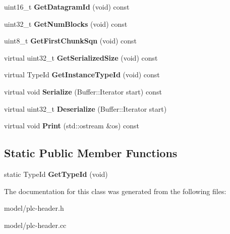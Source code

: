 \begin{DoxyCompactItemize}
\item 
\hypertarget{classns3_1_1PLC__RatelessPhyHeader_aae8ba518f5872336e48f451d7101afe5}{uint16\-\_\-t {\bfseries \-Get\-Datagram\-Id} (void) const }\label{classns3_1_1PLC__RatelessPhyHeader_aae8ba518f5872336e48f451d7101afe5}

\item 
\hypertarget{classns3_1_1PLC__RatelessPhyHeader_a4dd0aad08f2a7f408ae26c5296cb36e0}{uint32\-\_\-t {\bfseries \-Get\-Num\-Blocks} (void) const }\label{classns3_1_1PLC__RatelessPhyHeader_a4dd0aad08f2a7f408ae26c5296cb36e0}

\item 
\hypertarget{classns3_1_1PLC__RatelessPhyHeader_a5c2a261a5f1eb2fb9a241a66bbfcd61b}{uint8\-\_\-t {\bfseries \-Get\-First\-Chunk\-Sqn} (void) const }\label{classns3_1_1PLC__RatelessPhyHeader_a5c2a261a5f1eb2fb9a241a66bbfcd61b}

\item 
\hypertarget{classns3_1_1PLC__RatelessPhyHeader_a4375ffaae23e561781baa81eb71f0ef1}{virtual uint32\-\_\-t {\bfseries \-Get\-Serialized\-Size} (void) const }\label{classns3_1_1PLC__RatelessPhyHeader_a4375ffaae23e561781baa81eb71f0ef1}

\item 
\hypertarget{classns3_1_1PLC__RatelessPhyHeader_addc202d67e7b4478ef35467094c57907}{virtual \-Type\-Id {\bfseries \-Get\-Instance\-Type\-Id} (void) const }\label{classns3_1_1PLC__RatelessPhyHeader_addc202d67e7b4478ef35467094c57907}

\item 
\hypertarget{classns3_1_1PLC__RatelessPhyHeader_ae1dae1209e3062fca39cb871d463663e}{virtual void {\bfseries \-Serialize} (\-Buffer\-::\-Iterator start) const }\label{classns3_1_1PLC__RatelessPhyHeader_ae1dae1209e3062fca39cb871d463663e}

\item 
\hypertarget{classns3_1_1PLC__RatelessPhyHeader_a4905fafd63a55fcf0c5685562f34e08a}{virtual uint32\-\_\-t {\bfseries \-Deserialize} (\-Buffer\-::\-Iterator start)}\label{classns3_1_1PLC__RatelessPhyHeader_a4905fafd63a55fcf0c5685562f34e08a}

\item 
\hypertarget{classns3_1_1PLC__RatelessPhyHeader_a47b4c2899ad282ca5c585f39ff466ecd}{virtual void {\bfseries \-Print} (std\-::ostream \&os) const }\label{classns3_1_1PLC__RatelessPhyHeader_a47b4c2899ad282ca5c585f39ff466ecd}

\end{DoxyCompactItemize}
\subsection*{\-Static \-Public \-Member \-Functions}
\begin{DoxyCompactItemize}
\item 
\hypertarget{classns3_1_1PLC__RatelessPhyHeader_a0828f252b7d61acf0ba7f3b1a27f0f3f}{static \-Type\-Id {\bfseries \-Get\-Type\-Id} (void)}\label{classns3_1_1PLC__RatelessPhyHeader_a0828f252b7d61acf0ba7f3b1a27f0f3f}

\end{DoxyCompactItemize}


\-The documentation for this class was generated from the following files\-:\begin{DoxyCompactItemize}
\item 
model/plc-\/header.\-h\item 
model/plc-\/header.\-cc\end{DoxyCompactItemize}

